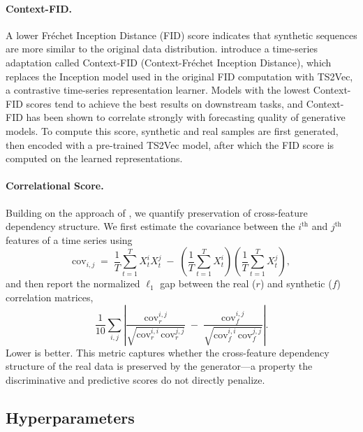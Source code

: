 \documentclass{article}
\theoremstyle{plain}
\theoremstyle{definition}
\theoremstyle{remark}
\begin{document}
\paragraph{Context-FID.}
A lower Fr\'echet Inception Distance (FID) score indicates that synthetic sequences are more similar to the original data distribution. \citet{yue2022ts2vec} introduce a time-series adaptation called Context-FID (Context-Fr\'echet Inception Distance), which replaces the Inception model used in the original FID computation with TS2Vec, a contrastive time-series representation learner. Models with the lowest Context-FID scores tend to achieve the best results on downstream tasks, and Context-FID has been shown to correlate strongly with forecasting quality of generative models. To compute this score, synthetic and real samples are first generated, then encoded with a pre-trained TS2Vec model, after which the FID score is computed on the learned representations.

\paragraph{Correlational Score.}
Building on the approach of \citet{liao2020conditional}, we quantify preservation of cross-feature dependency structure. We first estimate the covariance between the $i^{\mathrm{th}}$ and $j^{\mathrm{th}}$ features of a time series using
\[
\mathrm{cov}_{i,j} \;=\; \frac{1}{T} \sum_{t=1}^{T} X_t^{i} X_t^{j} \;-\; \left( \frac{1}{T} \sum_{t=1}^{T} X_t^{i} \right) \left( \frac{1}{T} \sum_{t=1}^{T} X_t^{j} \right),
\]
and then report the normalized $\ell_1$ gap between the real ($r$) and synthetic ($f$) correlation matrices,
\[
\frac{1}{10} \sum_{i,j} \left| \frac{\mathrm{cov}_r^{i,j}}{\sqrt{\mathrm{cov}_r^{i,i} \, \mathrm{cov}_r^{j,j}}} \;-\; \frac{\mathrm{cov}_f^{i,j}}{\sqrt{\mathrm{cov}_f^{i,i} \, \mathrm{cov}_f^{j,j}}} \right|.
\]
Lower is better. This metric captures whether the cross-feature dependency structure of the real data is preserved by the generator---a property the discriminative and predictive scores do not directly penalize.

\subsection{Hyperparameters}
\end{document}
